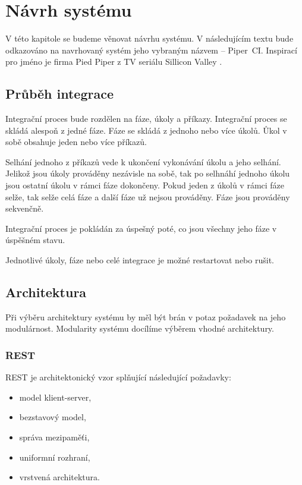 \chapter{Návrh systému}

V této kapitole se budeme věnovat návrhu systému.
V následujícím textu bude odkazováno na navrhovaný systém jeho vybraným názvem -- Piper~CI.
Inspirací pro jméno je firma Pied Piper z TV seriálu Sillicon Valley \cite{pied_piper}.

\section{Průběh integrace}

Integrační proces bude rozdělen na fáze, úkoly a příkazy.
Integrační proces se skládá alespoň z jedné fáze.
Fáze se skládá z jednoho nebo více úkolů.
Ůkol v sobě obsahuje jeden nebo více příkazů.

Selhání jednoho z příkazů vede k ukončení vykonávání úkolu a jeho selhání.
Jelikož jsou úkoly prováděny nezávisle na sobě, tak po selhnáhí jednoho úkolu jsou ostatní úkolu v rámci fáze dokončeny.
Pokud jeden z úkolů v rámci fáze selže, tak selže celá fáze a další fáze už nejsou prováděny.
Fáze jsou prováděny sekvenčně.

Integrační proces je pokládán za úspešný poté, co jsou všechny jeho fáze v úspěšném stavu.

Jednotlivé úkoly, fáze nebo celé integrace je možné restartovat nebo rušit.

\section{Architektura}

Při výběru architektury systému by měl být brán v potaz požadavek na jeho modulárnost.
Modularity systému docílíme výběrem vhodné architektury.

\subsection{REST}

REST je architektonický vzor splňující následující požadavky:

\begin{itemize}
    \item model klient-server,
    \item bezstavový model,
    \item správa mezipaměťi,
    \item uniformní rozhraní,
    \item vrstvená architektura. \cite{rest}
\end{itemize}

